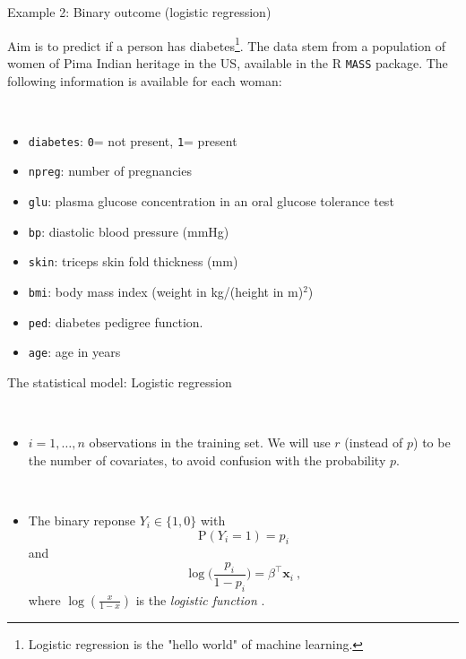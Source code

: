 \documentclass[10pt,ignorenonframetext,]{beamer}
\providecommand{\tightlist}{%
  \setlength{\itemsep}{0pt}\setlength{\parskip}{0pt}}
\begin{document}
\begin{frame}[fragile]

\begin{block}{Example 2: Binary outcome (logistic regression)}

\vspace{2mm}

Aim is to predict if a person has
diabetes\footnote{Logistic regression is the "hello world" of machine learning.}.
The data stem from a population of women of Pima Indian heritage in the
US, available in the R \texttt{MASS} package. The following information
is available for each woman:

\(~\)

\begin{itemize}
\tightlist
\item
  \texttt{diabetes}: \texttt{0}= not present, \texttt{1}= present
\item
  \texttt{npreg}: number of pregnancies
\item
  \texttt{glu}: plasma glucose concentration in an oral glucose
  tolerance test
\item
  \texttt{bp}: diastolic blood pressure (mmHg)
\item
  \texttt{skin}: triceps skin fold thickness (mm)
\item
  \texttt{bmi}: body mass index (weight in kg/(height in m)\(^2\))
\item
  \texttt{ped}: diabetes pedigree function.
\item
  \texttt{age}: age in years
\end{itemize}

\end{block}

\end{frame}

\begin{frame}

\begin{block}{The statistical model: Logistic regression}

\(~\)

\begin{itemize}
\tightlist
\item
  \(i=1,\ldots, n\) observations in the training set. We will use \(r\)
  (instead of \(p\)) to be the number of covariates, to avoid confusion
  with the probability \(p\).
\end{itemize}

\(~\)

\begin{itemize}
\tightlist
\item
  The binary reponse \(Y_i \in \{1, 0\}\) with
  \[\text{P}(Y_i =1 ) = p_i\] and
  \[\log \Big ( \frac{p_i}{1-p_i}\Big ) = \beta^\top {\boldsymbol x}_i \ ,\]
  where \(\log(\frac{x}{1-x})\) is the \emph{logistic function} .
\end{itemize}

\end{block}

\end{frame}
\end{document}
